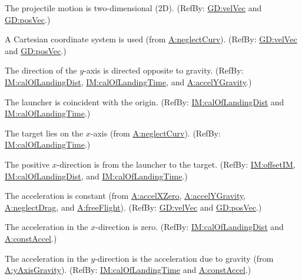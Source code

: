 \documentclass[12pt]{article}
\begin{document}
\begin{description}[font=\normalfont]
\item[twoDMotion:\phantomsection\label{twoDMotion}]{The projectile motion is two-dimensional (2D). (RefBy: \hyperref[GD:velVec]{GD:velVec} and \hyperref[GD:posVec]{GD:posVec}.)}
\item[cartSyst:\phantomsection\label{cartSyst}]{A Cartesian coordinate system is used (from \hyperref[neglectCurv]{A:neglectCurv}). (RefBy: \hyperref[GD:velVec]{GD:velVec} and \hyperref[GD:posVec]{GD:posVec}.)}
\item[yAxisGravity:\phantomsection\label{yAxisGravity}]{The direction of the $y$-axis is directed opposite to gravity. (RefBy: \hyperref[IM:calOfLandingDist]{IM:calOfLandingDist}, \hyperref[IM:calOfLandingTime]{IM:calOfLandingTime}, and \hyperref[accelYGravity]{A:accelYGravity}.)}
\item[launchOrigin:\phantomsection\label{launchOrigin}]{The launcher is coincident with the origin. (RefBy: \hyperref[IM:calOfLandingDist]{IM:calOfLandingDist} and \hyperref[IM:calOfLandingTime]{IM:calOfLandingTime}.)}
\item[targetXAxis:\phantomsection\label{targetXAxis}]{The target lies on the $x$-axis (from \hyperref[neglectCurv]{A:neglectCurv}). (RefBy: \hyperref[IM:calOfLandingTime]{IM:calOfLandingTime}.)}
\item[posXDirection:\phantomsection\label{posXDirection}]{The positive $x$-direction is from the launcher to the target. (RefBy: \hyperref[IM:offsetIM]{IM:offsetIM}, \hyperref[IM:calOfLandingDist]{IM:calOfLandingDist}, and \hyperref[IM:calOfLandingTime]{IM:calOfLandingTime}.)}
\item[constAccel:\phantomsection\label{constAccel}]{The acceleration is constant (from \hyperref[accelXZero]{A:accelXZero}, \hyperref[accelYGravity]{A:accelYGravity}, \hyperref[neglectDrag]{A:neglectDrag}, and \hyperref[freeFlight]{A:freeFlight}). (RefBy: \hyperref[GD:velVec]{GD:velVec} and \hyperref[GD:posVec]{GD:posVec}.)}
\item[accelXZero:\phantomsection\label{accelXZero}]{The acceleration in the $x$-direction is zero. (RefBy: \hyperref[IM:calOfLandingDist]{IM:calOfLandingDist} and \hyperref[constAccel]{A:constAccel}.)}
\item[accelYGravity:\phantomsection\label{accelYGravity}]{The acceleration in the $y$-direction is the acceleration due to gravity (from \hyperref[yAxisGravity]{A:yAxisGravity}). (RefBy: \hyperref[IM:calOfLandingTime]{IM:calOfLandingTime} and \hyperref[constAccel]{A:constAccel}.)}

\end{description}
\end{document}
